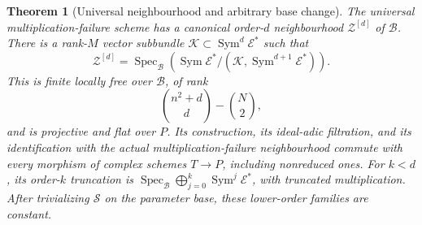 \documentclass[11pt,reqno]{amsart}
\numberwithin{equation}{section}
\newtheorem{theorem}{Theorem}[section]
\theoremstyle{definition}\newtheorem{definition}[theorem]{Definition}
\theoremstyle{remark}\newtheorem{remark}[theorem]{Remark}
\DeclareMathOperator{\Sym}{Sym}\DeclareMathOperator{\Gr}{Gr}
\DeclareMathOperator{\Spec}{Spec}\DeclareMathOperator{\PGL}{PGL}
\begin{document}
\begin{theorem}[Universal neighbourhood and arbitrary base change]
\label{thm:universal-finite-neighbourhood}
The universal multiplication-failure scheme has a canonical order-\(d\)
neighbourhood \(\mathcal Z^{[d]}\) of \(\mathcal B\).  There is a
rank-\(M\) vector subbundle
\(\mathcal K\subset\Sym^d\mathcal E^*\) such that
\begin{equation}\label{eq:universal-truncated-algebra}
 \mathcal Z^{[d]}=
 \Spec_{\mathcal B}\left(
 \Sym\mathcal E^*/
 (\mathcal K,\Sym^{d+1}\mathcal E^*)\right).
\end{equation}
This is finite locally free over \(\mathcal B\), of rank
\begin{equation}\label{eq:universal-finite-rank}
                   \binom{n^2+d}{d}-\binom N2,
\end{equation}
and is projective and flat over \(P\).  Its construction, its
ideal-adic filtration, and its identification with the actual
multiplication-failure neighbourhood commute with every morphism of
complex schemes \(T\to P\), including nonreduced ones.
For \(k<d\), its order-\(k\) truncation is
\(\Spec_{\mathcal B}\bigoplus_{j=0}^k\Sym^j\mathcal E^*\),
with truncated multiplication.  After trivializing \(\mathcal S\)
on the parameter base, these lower-order families are constant.
\end{theorem}
\end{document}
